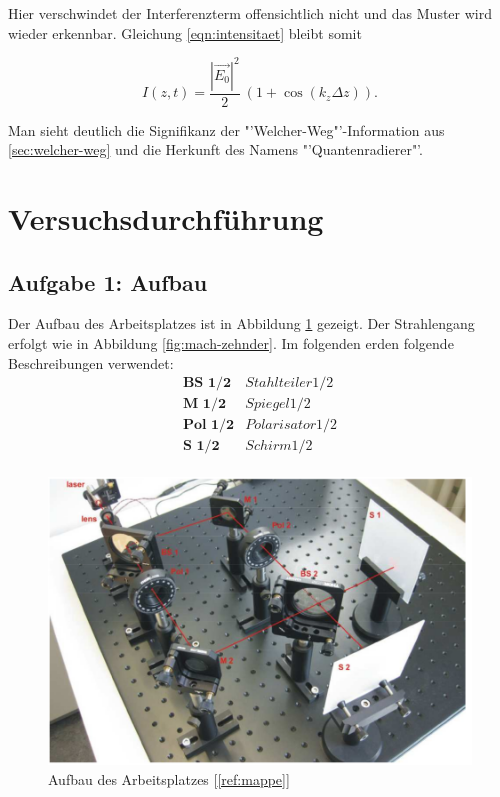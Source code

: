 \documentclass[a4paper,ngerman]{scrartcl}
\begin{document}
Hier verschwindet der Interferenzterm offensichtlich nicht und das Muster wird wieder erkennbar. Gleichung \ref{eqn:intensitaet} bleibt somit

\begin{equation}
I(z,t) = \frac{|\vec{E_0}|^2}{2} \ (1+\cos(k_z\Delta z) ).
\end{equation}

Man sieht deutlich die Signifikanz der "'Welcher-Weg"'-Information aus \ref{sec:welcher-weg} und die Herkunft des Namens "'Quantenradierer"'.


\section{Versuchsdurchführung}
\label{sec:versuchsdurchfuhrung}

\subsection{Aufgabe 1: Aufbau}
\label{ssec:aufbau}

Der Aufbau des Arbeitsplatzes ist in Abbildung \ref{fig:aufbau} gezeigt. Der Strahlengang erfolgt wie in Abbildung \ref{fig:mach-zehnder}. Im folgenden erden folgende Beschreibungen verwendet:
\[
\begin{matrix}
\textbf{BS 1/2}	&	Stahlteiler 1/2 \\
\textbf{M 1/2}	&	Spiegel 1/2 \\
\textbf{Pol 1/2}	&	Polarisator 1/2 \\
\textbf{S 1/2}	&	Schirm 1/2 \\
\end{matrix}
\]

\begin{figure}
\includegraphics[width=\textwidth]{aufbau.png}
\caption{Aufbau des Arbeitsplatzes [\ref{ref:mappe}]}
\label{fig:aufbau}
\end{figure}
\end{document}
